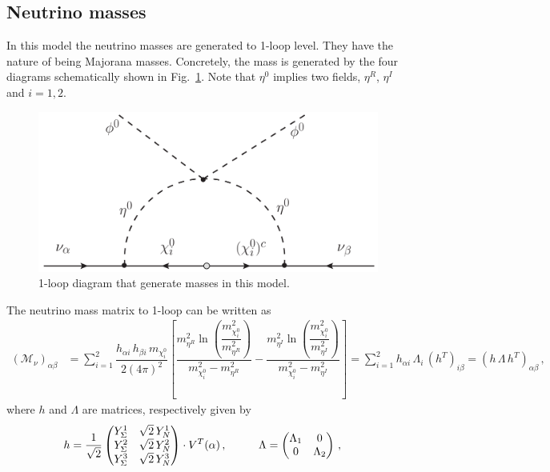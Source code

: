 \documentclass[12pt,letterpaper]{article}
\begin{document}
   






\subsection{Neutrino masses}
\label{sec:neutrino-masses}

In this model the neutrino masses are generated to 1-loop level. They have the nature of being Majorana masses. Concretely, the mass is generated by the four diagrams schematically shown in Fig.~\ref{fig:mass-diagram}. Note that $\eta^0$ implies two fields, $\eta^R$, $\eta^I$ and $i=1,2$.
%
\begin{figure}
\begin{center}
\includegraphics[scale=0.4]{mass-diagram}
\caption{1-loop diagram that generate masses in this model. }
\label{fig:mass-diagram}
\end{center}
\end{figure}
%
The neutrino mass matrix to 1-loop can be written as
%
\begin{align}
\label{eq:Mv-mass-matrix}
(\mathcal{M}_\nu)_{\alpha\beta} &= \sum_{i=1}^2\dfrac{h_{\alpha i}\,h_{\beta i}\,m_{\chi_i^0}}{2(4\pi)^2}
\left[
\dfrac{m_{\eta^R}^2\ln\left(\dfrac{m_{\chi_i^0}^2}{m_{\eta^R}^2}\right)}{m_{\chi_i^0}^2-m_{\eta^R}^2}
-\dfrac{m_{\eta^I}^2\ln\left(\dfrac{m_{\chi_i^0}^2}{m_{\eta^I}^2}\right)}{m_{\chi_i^0}^2-m_{\eta^I}^2}
\right] = \sum_{i=1}^2h_{\alpha i}\,\Lambda_i\,(h^T)_{i\beta}
=(h\,\Lambda\,h^T)_{\alpha\beta}\,,
\end{align}
%
where $h$ and $\Lambda$ are matrices, respectively given by
%
\begin{align}
\label{eq:h-Lambda-matrices}
h &= \dfrac{1}{\sqrt{2}}
\begin{pmatrix}
Y_{\Sigma}^1 & \sqrt{2}\,Y_N^1 \\
Y_{\Sigma}^2 & \sqrt{2}\,Y_N^2 \\
Y_{\Sigma}^3 & \sqrt{2}\,Y_N^3
\end{pmatrix}
\cdot V^{T}(\alpha)\,,
\hspace{1 cm}
\Lambda=
\begin{pmatrix}
\Lambda_1 & 0 \\
0 & \Lambda_2
\end{pmatrix}\,,
\end{align}
\end{document}
